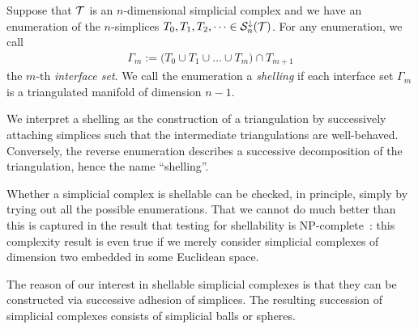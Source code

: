 \documentclass[10pt,letterpaper]{article}
\newcommand{\mwl}[1]{{\color{red}#1}}
\begin{document}



Suppose that ${\mathcal T}$ is an $n$-dimensional simplicial complex and we have an enumeration of the $n$-simplices $T_{0}, T_{1}, T_{2}, \dots \in {\mathcal S}^{\downarrow}_{n}({\mathcal T})$.
For any enumeration, we call 
\begin{align*}
    \Gamma_m 
    := 
    \big( 
        T_{0} \cup T_{1} \cup \dots \cup T_{m} 
    \big) 
    \cap 
    T_{m+1}
\end{align*}
the $m$-th \textit{interface set}. 
We call the enumeration a \emph{shelling} if each interface set $\Gamma_m$ is a triangulated manifold of dimension $n-1$. 

\begin{remark}
    We interpret a shelling as the construction of a triangulation 
    by successively attaching simplices such that the intermediate triangulations are well-behaved. 
    Conversely, the reverse enumeration describes a successive decomposition of the triangulation, hence the name ``shelling''.
\end{remark}
\begin{remark}
    Whether a simplicial complex is shellable can be checked, in principle, simply by trying out all the possible enumerations.
    That we cannot do much better than this is captured in the result that testing for shellability is NP-complete~\cite{goaoc2019shellability}:
    this complexity result is even true if we merely consider simplicial complexes of dimension two embedded in some Euclidean space.
\end{remark}


The reason of our interest in shellable simplicial complexes is that they can be constructed via successive adhesion of simplices.
The resulting succession of simplicial complexes consists of simplicial balls or spheres. 
\end{document}
